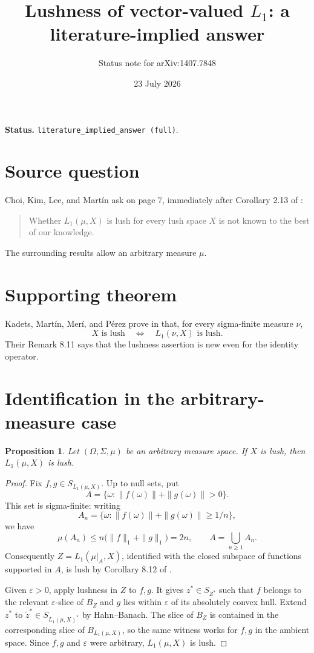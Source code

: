 \documentclass[11pt]{article}
\title{Lushness of vector-valued \(L_1\): a literature-implied answer}
\author{Status note for arXiv:1407.7848}
\date{23 July 2026}
\newtheorem*{proposition}{Proposition}
\begin{document}
\maketitle

\noindent\textbf{Status.}
\texttt{literature\_implied\_answer (full)}.

\section*{Source question}

Choi, Kim, Lee, and Mart\'in ask on page 7, immediately after
Corollary 2.13 of \cite{CKLM}:
\begin{quote}
Whether \(L_1(\mu,X)\) is lush for every lush space \(X\) is not known
to the best of our knowledge.
\end{quote}
The surrounding results allow an arbitrary measure \(\mu\).

\section*{Supporting theorem}

Kadets, Mart\'in, Mer\'i, and P\'erez prove in
\cite[Theorem 8.10(b) and Corollary 8.12, p.~92]{KMMB} that, for every
sigma-finite measure \(\nu\),
\[
  X\text{ is lush}\quad\Longleftrightarrow\quad
  L_1(\nu,X)\text{ is lush}.
\]
Their Remark 8.11 says that the lushness assertion is new even for the
identity operator.

\section*{Identification in the arbitrary-measure case}

\begin{proposition}
Let \((\Omega,\Sigma,\mu)\) be an arbitrary measure space.  If \(X\) is
lush, then \(L_1(\mu,X)\) is lush.
\end{proposition}

\begin{proof}
Fix \(f,g\in S_{L_1(\mu,X)}\).  Up to null sets, put
\[
 A=\{\omega:\|f(\omega)\|+\|g(\omega)\|>0\}.
\]
This set is sigma-finite: writing
\[
 A_n=\{\omega:\|f(\omega)\|+\|g(\omega)\|\ge 1/n\},
\]
we have
\[
 \mu(A_n)\le n\bigl(\|f\|_1+\|g\|_1\bigr)=2n,
 \qquad A=\bigcup_{n\ge1}A_n.
\]
Consequently \(Z=L_1(\mu|_A,X)\), identified with the closed subspace
of functions supported in \(A\), is lush by Corollary 8.12 of
\cite{KMMB}.

Given \(\varepsilon>0\), apply lushness in \(Z\) to \(f,g\).  It gives
\(z^*\in S_{Z^*}\) such that \(f\) belongs to the relevant
\(\varepsilon\)-slice of \(B_Z\) and \(g\) lies within \(\varepsilon\)
of its absolutely convex hull.  Extend \(z^*\) to
\(\widetilde z^*\in S_{L_1(\mu,X)^*}\) by Hahn--Banach.  The slice of
\(B_Z\) is contained in the corresponding slice of
\(B_{L_1(\mu,X)}\), so the same witness works for \(f,g\) in the
ambient space.  Since \(f,g\) and \(\varepsilon\) were arbitrary,
\(L_1(\mu,X)\) is lush.
\end{proof}
\end{document}
